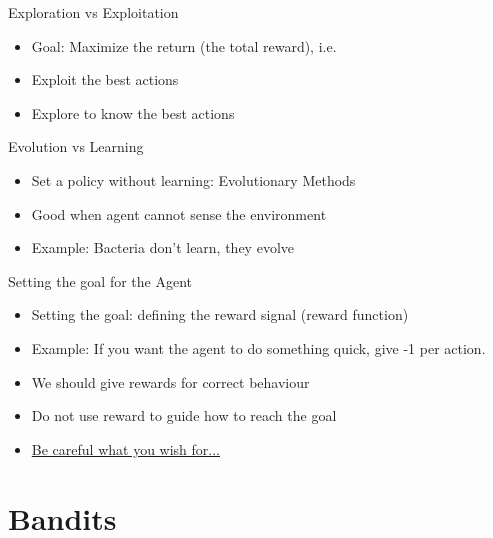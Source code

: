 \documentclass[10pt]{beamer}
\begin{document}
\begin{frame}{Exploration vs Exploitation}

\begin{itemize}
\item {\color{uured} Goal}: Maximize the return (the total reward), i.e.\pause
\item {\color{uured} Exploit} the best actions\pause
\item {\color{uured} Explore} to know the best actions
\end{itemize}

\end{frame}

\begin{frame}{Evolution vs Learning}

\begin{itemize}
\item Set a policy without learning: {\color{uured} Evolutionary} Methods
\item Good when agent cannot sense the environment\pause
\item {\color{uured} Example}: Bacteria don't learn, they evolve
\end{itemize}

\end{frame}


\begin{frame}{Setting the goal for the Agent}

\begin{itemize}
\item Setting the goal: {\color{uured} defining the reward} signal (reward function)
\item {\color{uured} Example}: If you want the agent to do something quick, give -1 per action.\pause
\item We should give rewards for correct {\color{uured} behaviour}
\item Do {\color{uured} not} use reward to guide {\color{uured} how} to reach the goal
\item \href{https://openai.com/blog/faulty-reward-functions/}{{\color{blue} Be careful what you wish for...}}
\end{itemize}

\end{frame}


\section{Bandits}
\frame{\sectionpage}
\end{document}
